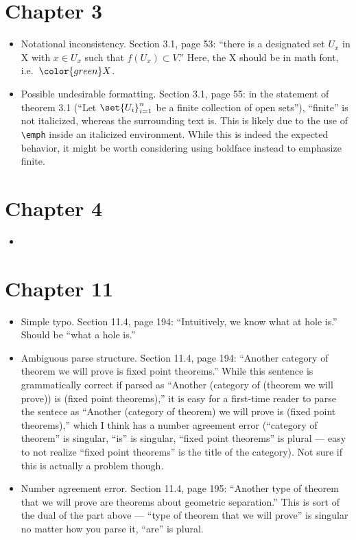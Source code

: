 \documentclass{fkletter}
\begin{document}
\section*{Chapter 3}
\begin{itemize}
  \item Notational inconsistency. Section 3.1, page 53: ``there is a designated
    set $U_x$ in {\color{red} X} with $x \in U_x$ such that $f(U_x) \subset
    V$.'' Here, the {\color{red} X} should be in math font, i.e.\
    ${\color{green} X}$.
  \item Possible undesirable formatting. Section 3.1, page 55: in the statement
    of theorem 3.1 (``Let $\set{U_i}_{i=1}^n$ be a finite collection of open
    sets''), ``finite'' is not italicized, whereas the surrounding text is. This
    is likely due to the use of \verb|\emph| inside an italicized environment.
    While this is indeed the expected behavior, it might be worth considering
    using boldface instead to emphasize finite.
\end{itemize}
\section*{Chapter 4}
\begin{itemize}
  \item
\end{itemize}
\section*{Chapter 11}
\begin{itemize}
  \item Simple typo. Section 11.4, page 194: ``Intuitively, we know what
    {\color{red} at} hole is.'' Should be ``what {\color{green} a} hole is.''
  \item Ambiguous parse structure. Section 11.4, page 194: ``Another category of
    theorem we will prove is fixed point theorems.'' While this sentence is
    grammatically correct if parsed as ``Another (category of (theorem we will
    prove)) is (fixed point theorems),'' it is easy for a first-time reader to
    parse the sentece as ``Another (category of theorem) we will prove is (fixed
    point theorems),'' which I think has a number agreement error (``category of
    theorem'' is singular, ``is'' is singular, ``fixed point theorems'' is
    plural --- easy to not realize ``fixed point theorems'' is the title of the
    category). Not sure if this is actually a problem though.
  \item Number agreement error. Section 11.4, page 195: ``Another type of
    theorem that we will prove {\color{red} are} theorems about geometric
    separation.'' This is sort of the dual of the part above --- ``type of
    theorem that we will prove'' is singular no matter how you parse it, ``are''
    is plural.
\end{itemize}
\end{document}
